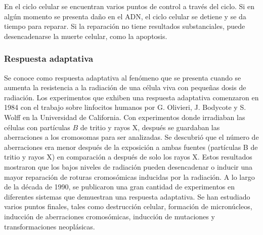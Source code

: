En el ciclo celular se encuentran varios puntos de control a través del ciclo. Si en algún momento se presenta daño en el ADN, el ciclo celular se detiene y se da tiempo para reparar. Si la reparación no tiene resultados substanciales, puede desencadenarse la muerte celular, como la apoptosis.


\subsubsection{Respuesta adaptativa}
Se conoce como respuesta adaptativa al fenómeno que se presenta cuando se aumenta la resistencia a la radiación de una  célula viva con pequeñas dosis de radiación.
Los experimentos que exhiben una respuesta adaptativa comenzaron en 1984 con el trabajo sobre linfocitos humanos por G. Olivieri, J. Bodycote y S. Wolff en la Universidad de California. Con experimentos donde irradiaban las células con partículas $B$ de tritio y rayos X, después se guardaban  las aberraciones a los cromosomas para ser analizadas. Se descubrió que el número de aberraciones era menor después de la exposición a ambas fuentes (partículas B de tritio y rayos X) en comparación a después de  solo los rayos X. Estos resultados mostraron que los bajos niveles de radiación pueden desencadenar o inducir una mayor reparación de roturas cromosómicas inducidas por la radiación.
A lo largo de la década de 1990, se publicaron una gran cantidad de experimentos en diferentes sistemas que demuestran una respuesta adaptativa. Se han estudiado varios puntos finales, tales como destrucción celular, formación de micronúcleos, inducción de aberraciones cromosómicas, inducción de mutaciones y transformaciones neoplásicas\cite{Thormod}.
